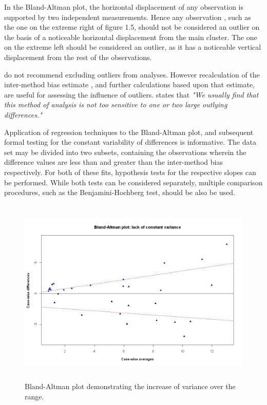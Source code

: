 \documentclass[Main.tex]{subfiles}
\begin{document}
	In the Bland-Altman plot, the horizontal displacement of any
	observation is supported by two independent measurements. Hence
	any observation , such as the one on the extreme right of figure
	1.5, should not be considered an outlier on the basis of a
	noticeable horizontal displacement from the main cluster. The one
	on the extreme left should be considered an outlier, as it has a
	noticeable vertical displacement from the rest of the
	observations.
	
	\citet*{BA99} do not recommend excluding outliers from analyses.
	However recalculation of the inter-method bias estimate , and
	further calculations based upon that estimate, are useful for
	assessing the influence of outliers.\citep{BA99} states that
	\emph{"We usually find that this method of analysis is not too
		sensitive to one or two large outlying differences."}


	
	Application of regression techniques to the Bland-Altman plot, and
	subsequent formal testing for the constant variability of
	differences is informative. The data set may be divided into two
	subsets, containing the observations wherein the difference values
	are less than and greater than the inter-method bias respectively.
	For both of these fits, hypothesis tests for the respective slopes
	can be performed. While both tests can be considered separately,
	multiple comparison procedures, such as the Benjamini-Hochberg
	\citep{BH} test, should be also be used.
	
	\begin{figure}[h!]
		\begin{center}
			\includegraphics[height=90mm]{images/BAFanEffect.jpeg}
			\caption{Bland-Altman plot demonstrating the increase of variance over the range.}\label{BAFanEffect}
		\end{center}
	\end{figure}
	
\end{document}

